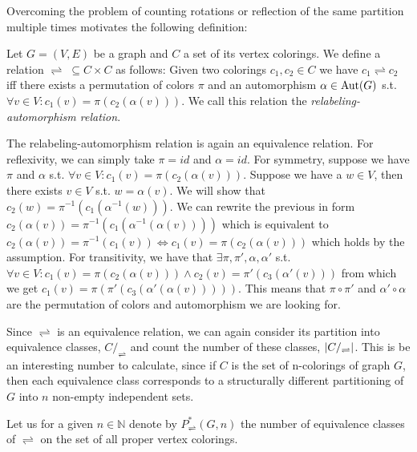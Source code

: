 \begin{highlight}
Overcoming the problem of counting rotations or reflection of the same partition multiple times motivates the following definition:

\begin{defn}
    Let $G=(V,E)$ be a graph and $C$ a set of its vertex colorings. We define a relation $\rightleftharpoons \; \subseteq C \times C$ as follows: Given two colorings $c_1,c_2 \in C$ we have $c_1 \rightleftharpoons c_2$ iff there exists a permutation of colors $\pi$ and an automorphism $\alpha \in \operatorname{Aut}(G)$ s.t. $\forall v \in V : c_1(v) = \pi(c_2(\alpha(v)))$. We call this relation the \emph{relabeling-automorphism relation}.
\end{defn}

The relabeling-automorphism relation is again an equivalence relation. For reflexivity, we can simply take $\pi = id$ and $\alpha = id$. For symmetry, suppose we have $\pi$ and $\alpha$ s.t. $\forall v \in V : c_1(v) = \pi(c_2(\alpha(v)))$. Suppose we have a $w \in V$, then there exists $v \in V$ s.t. $w = \alpha(v)$. We will show that $c_2(w) = \pi^{-1}(c_1(\alpha^{-1}(w)))$. We can rewrite the previous in form $c_2(\alpha(v)) = \pi^{-1}(c_1(\alpha^{-1}(\alpha(v))))$ which is equivalent to $c_2(\alpha(v)) = \pi^{-1}(c_1(v)) \iff c_1(v) = \pi(c_2(\alpha(v)))$ which holds by the assumption. For transitivity, we have that $\exists \pi, \pi', \alpha ,\alpha'$ s.t. $\forall v \in V : c_1(v) = \pi(c_2(\alpha(v))) \wedge c_2(v) = \pi'(c_3(\alpha'(v)))$ from which we get $c_1(v)=\pi(\pi'(c_3(\alpha'(\alpha(v)))))$. This means that $\pi \circ \pi'$ and $\alpha' \circ \alpha$ are the permutation of colors and automorphism we are looking for.

Since $\rightleftharpoons$ is an equivalence relation, we can again consider its partition into equivalence classes, $C/_\rightleftharpoons$ and count the number of these classes, $\left|{C/_\rightleftharpoons}\right|$. This is be an interesting number to calculate, since if $C$ is the set of n-colorings of graph $G$, then each equivalence class corresponds to a structurally different partitioning of $G$ into $n$ non-empty independent sets.

\begin{defn}
    Let us for a given $n \in \mathbb{N}$ denote by $P^*_{\rightleftharpoons}(G,n)$ the number of equivalence classes of $\rightleftharpoons$ on the set of all proper vertex colorings. 
\end{defn}


\end{highlight}
